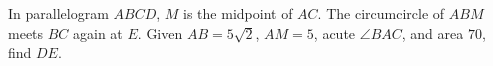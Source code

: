 In parallelogram $ABCD$, $M$ is the midpoint of $AC$. The circumcircle of $ABM$ meets $BC$ again at $E$. Given $AB=5\sqrt2$, $AM=5$, acute $\angle BAC$, and area $70$, find $DE$.
